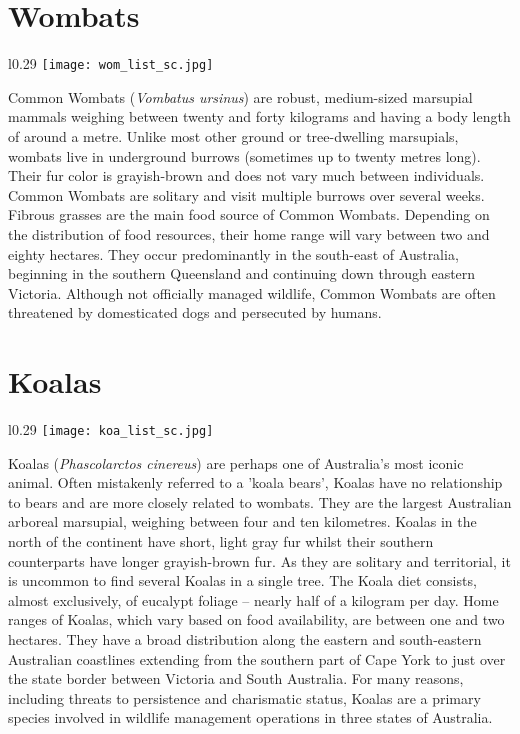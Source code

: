 \section{Wombats}\label{wom}
\vspace{-0.3cm}
\setlength\intextsep{0pt}
\begin{wrapfigure}{l}{0.29\textwidth}
\centering
\texttt{[image: wom\_list\_sc.jpg]}
\end{wrapfigure}
Common Wombats (\textit{Vombatus ursinus}) are robust, medium-sized marsupial mammals weighing between twenty and forty kilograms and having a body length of around a metre. Unlike most other ground or tree-dwelling marsupials, wombats live in underground burrows (sometimes up to twenty metres long). Their fur color is grayish-brown and does not vary much between individuals. Common Wombats are solitary and visit multiple burrows over several weeks. Fibrous grasses are the main food source of Common Wombats. Depending on the distribution of food resources, their home range will vary between two and eighty hectares. They occur predominantly in the south-east of Australia, beginning in the southern Queensland and continuing down through eastern Victoria. Although not officially managed wildlife, Common Wombats are often threatened by domesticated dogs and persecuted by humans.

\section{Koalas}\label{koa}
\vspace{-0.3cm}
\setlength\intextsep{0pt}
\begin{wrapfigure}{l}{0.29\textwidth}
\centering
\texttt{[image: koa\_list\_sc.jpg]}
\end{wrapfigure}
Koalas (\textit{Phascolarctos cinereus}) are perhaps one of Australia's most iconic animal. Often mistakenly referred to a 'koala bears', Koalas have no relationship to bears and are more closely related to wombats. They are the largest Australian arboreal marsupial, weighing between four and ten kilometres. Koalas in the north of the continent have short, light gray fur whilst their southern counterparts have longer grayish-brown fur. As they are solitary and territorial, it is uncommon to find several Koalas in a single tree. The Koala diet consists, almost exclusively, of eucalypt foliage -- nearly half of a kilogram per day. Home ranges of Koalas, which vary based on food availability, are between one and two hectares. They have a broad distribution along the eastern and south-eastern Australian coastlines extending from the southern part of Cape York to just over the state border between Victoria and South Australia. For many reasons, including threats to persistence and charismatic status, Koalas are a primary species involved in wildlife management operations in three states of Australia.

